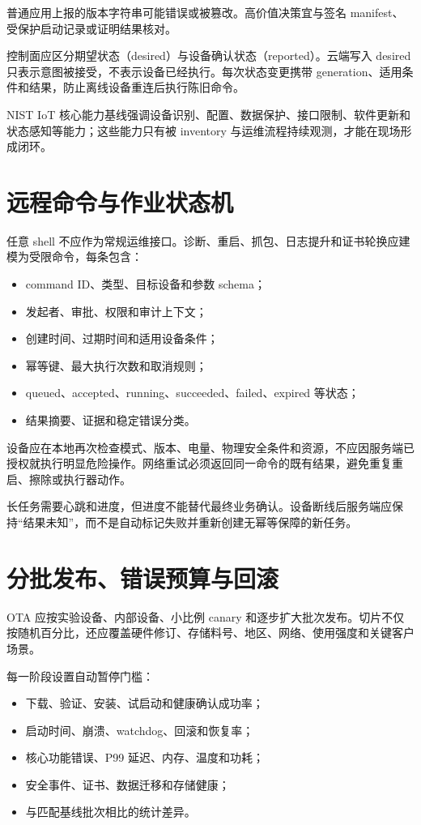 普通应用上报的版本字符串可能错误或被篡改。高价值决策宜与签名 manifest、受保护启动记录或证明结果核对。

控制面应区分期望状态（desired）与设备确认状态（reported）。云端写入 desired 只表示意图被接受，不表示设备已经执行。每次状态变更携带 generation、适用条件和结果，防止离线设备重连后执行陈旧命令。

NIST IoT 核心能力基线强调设备识别、配置、数据保护、接口限制、软件更新和状态感知等能力\cite{nist-iot-core-baseline}；这些能力只有被 inventory 与运维流程持续观测，才能在现场形成闭环。

\section{远程命令与作业状态机}

任意 shell 不应作为常规运维接口。诊断、重启、抓包、日志提升和证书轮换应建模为受限命令，每条包含：

\begin{itemize}
  \item command ID、类型、目标设备和参数 schema；
  \item 发起者、审批、权限和审计上下文；
  \item 创建时间、过期时间和适用设备条件；
  \item 幂等键、最大执行次数和取消规则；
  \item queued、accepted、running、succeeded、failed、expired 等状态；
  \item 结果摘要、证据和稳定错误分类。
\end{itemize}

设备应在本地再次检查模式、版本、电量、物理安全条件和资源，不应因服务端已授权就执行明显危险操作。网络重试必须返回同一命令的既有结果，避免重复重启、擦除或执行器动作。

长任务需要心跳和进度，但进度不能替代最终业务确认。设备断线后服务端应保持“结果未知”，而不是自动标记失败并重新创建无幂等保障的新任务。

\section{分批发布、错误预算与回滚}

OTA 应按实验设备、内部设备、小比例 canary 和逐步扩大批次发布。切片不仅按随机百分比，还应覆盖硬件修订、存储料号、地区、网络、使用强度和关键客户场景。

每一阶段设置自动暂停门槛：

\begin{itemize}
  \item 下载、验证、安装、试启动和健康确认成功率；
  \item 启动时间、崩溃、watchdog、回滚和恢复率；
  \item 核心功能错误、P99 延迟、内存、温度和功耗；
  \item 安全事件、证书、数据迁移和存储健康；
  \item 与匹配基线批次相比的统计差异。
\end{itemize}

